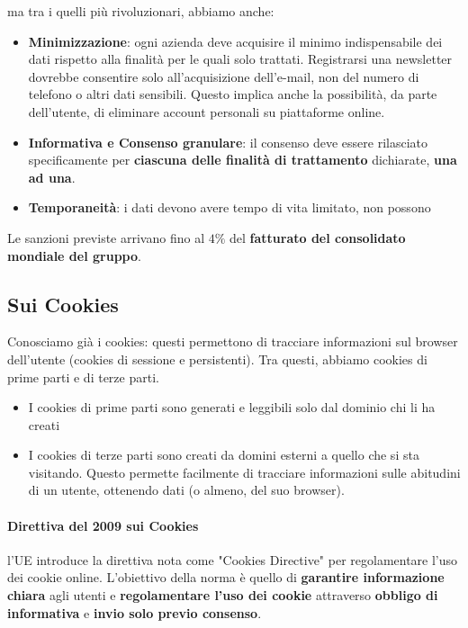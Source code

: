 \noindent
ma tra i quelli più rivoluzionari, abbiamo anche:
\begin{itemize}
	\item \textbf{Minimizzazione}: ogni azienda deve acquisire il minimo indispensabile dei dati rispetto alla finalità per le quali solo trattati. Registrarsi una newsletter dovrebbe consentire solo all'acquisizione dell'e-mail, non del numero di telefono o altri dati sensibili. Questo implica anche la possibilità, da parte dell'utente, di eliminare account personali su piattaforme online.
	\item \textbf{Informativa e Consenso granulare}: il consenso deve essere rilasciato specificamente per \textbf{ciascuna delle finalità di trattamento} dichiarate, \textbf{una ad una}.
	
	\item \textbf{Temporaneità}: i dati devono avere tempo di vita limitato, non possono 
\end{itemize}

Le sanzioni previste arrivano fino al $4\%$ del \textbf{fatturato del consolidato mondiale del gruppo}.

\subsection{Sui Cookies}
Conosciamo già i cookies: questi permettono di tracciare informazioni sul browser dell'utente (cookies di sessione e persistenti). Tra questi, abbiamo cookies di prime parti e di terze parti.

\begin{itemize}
	\item I cookies di prime parti sono generati e leggibili solo dal dominio chi li ha creati
	\item I cookies di terze parti sono creati da domini esterni a quello che si sta visitando. Questo permette facilmente di tracciare informazioni sulle abitudini di un utente, ottenendo dati (o almeno, del suo browser).
\end{itemize}

\paragraph{Direttiva del 2009 sui Cookies} l'UE introduce la direttiva nota come "Cookies Directive" per regolamentare l'uso dei cookie online. L'obiettivo della norma è quello di \textbf{garantire informazione chiara} agli utenti e \textbf{regolamentare l'uso dei cookie} attraverso \textbf{obbligo di informativa} e \textbf{invio solo previo consenso}.

